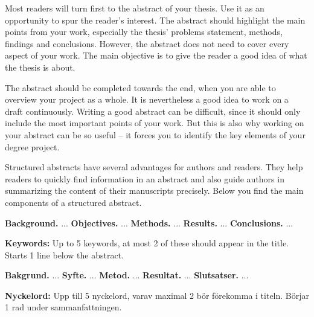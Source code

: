 \documentclass[a4paper,twoside]{bth}
\begin{document}
\abstract
Most readers will turn first to the abstract of your thesis. Use it as an opportunity to spur the reader's interest. The abstract should highlight the main points from your work, especially the thesis' problems statement, methods, findings and conclusions. However, the abstract does not need to cover every aspect of your work. The main objective is to give the reader a good idea of what the thesis is about.

The abstract should be completed towards the end, when you are able to overview your project as a whole. It is nevertheless a good idea to work on a draft continuously. Writing a good abstract can be difficult, since it should only include the most important points of your work. But this is also why working on your abstract can be so useful -- it forces you to identify the key elements of your degree project.

Structured abstracts have several advantages for authors and readers. They help readers to quickly find information in an abstract and also guide authors in summarizing the content of their manuscripts precisely. Below you find the main components of a structured abstract.

\noindent
\textbf{Background.} ... \newline
\textbf{Objectives.} ... \newline
\textbf{Methods.} ... \newline
\textbf{Results.} ... \newline
\textbf{Conclusions.} ...

\vspace{1cm}
\noindent
\textbf{Keywords:} Up to 5 keywords, at most 2 of these should appear in the title. Starts 1 line below the abstract.

\cleardoublepage


\sammanfattning
{}
\noindent
\textbf{Bakgrund.} ... \newline
\textbf{Syfte.} ... \newline
\textbf{Metod.} ... \newline
\textbf{Resultat.} ... \newline
\textbf{Slutsatser.} ...

\vspace{1cm}
\noindent
\textbf{Nyckelord:} Upp till 5 nyckelord, varav maximal 2 bör förekomma i titeln. Börjar 1 rad under sammanfattningen.
\end{document}
